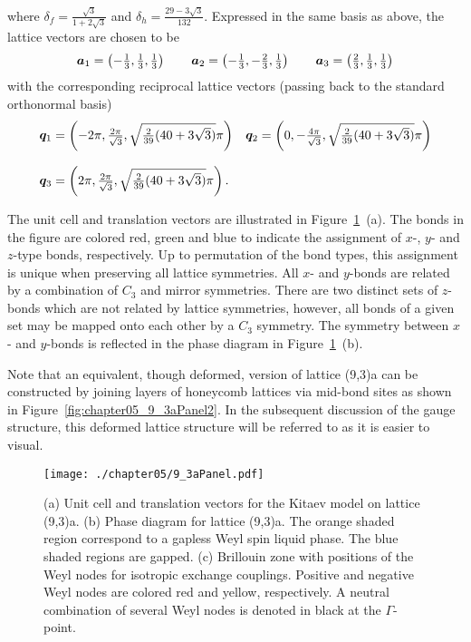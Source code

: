 %
where $\delta_f = \frac{\sqrt{3}}{1 + 2\sqrt{3}}$ and $\delta_h = \frac{29 - 3\sqrt{3}}{132}$.
Expressed in the same basis as above, the lattice vectors are chosen to be
%
\begin{equation}
	\begin{matrix*}[l]
		\ba_1 = \left(-\frac{1}{3}, \frac{1}{3}, \frac{1}{3}\right) \qquad
		\ba_2 = \left(-\frac{1}{3}, -\frac{2}{3}, \frac{1}{3}\right) \qquad
		\ba_3 = \left(\frac{2}{3}, \frac{1}{3}, \frac{1}{3}\right)
	\end{matrix*}
\end{equation}
%
with the corresponding reciprocal lattice vectors (passing back to the standard orthonormal basis)
%
\begin{equation}
	\begin{matrix*}[l]
		\bq_1 = \left(-2\pi, \frac{2\pi}{\sqrt{3}}, \sqrt{\frac{2}{39}(40 + 3\sqrt{3})}\pi\right) &
		\bq_2 = \left(0, -\frac{4\pi}{\sqrt{3}}, \sqrt{\frac{2}{39}(40 + 3\sqrt{3})}\pi\right) \\
		&\\
		\bq_3 = \left(2\pi, \frac{2\pi}{\sqrt{3}}, \sqrt{\frac{2}{39}(40 + 3\sqrt{3})}\pi\right). &
	\end{matrix*}
\end{equation}
%

The unit cell and translation vectors are illustrated in Figure~\ref{fig:chapter05_9_3aPanel}~(a).
The bonds in the figure are colored red, green and blue to indicate the assignment of $x$-, $y$- and $z$-type bonds, respectively.
Up to permutation of the bond types, this assignment is unique when preserving all lattice symmetries.
All $x$- and $y$-bonds are related by a combination of $C_3$ and mirror symmetries.
There are two distinct sets of $z$-bonds which are not related by lattice symmetries, however, all bonds of a given set may be mapped onto each other by a $C_3$ symmetry.
The symmetry between $x$- and $y$-bonds is reflected in the phase diagram in Figure~\ref{fig:chapter05_9_3aPanel}~(b).

Note that an equivalent, though deformed, version of lattice (9,3)a can be constructed by joining layers of honeycomb lattices via mid-bond sites as shown in Figure~\ref{fig:chapter05_9_3aPanel2}.
In the subsequent discussion of the gauge structure, this deformed lattice structure will be referred to as it is easier to visual.
%
\begin{figure}[tb]
	\centering
	\texttt{[image: ./chapter05/9\_3aPanel.pdf]}
	\caption{
		(a) Unit cell and translation vectors for the Kitaev model on lattice (9,3)a.
		(b) Phase diagram for lattice (9,3)a.
		The orange shaded region correspond to a gapless Weyl spin liquid phase.
		The blue shaded regions are gapped.
		(c) Brillouin zone with positions of the Weyl nodes for isotropic exchange couplings.
		Positive and negative Weyl nodes are colored red and yellow, respectively.
		A neutral combination of several Weyl nodes is denoted in black at the $\Gamma$-point.
	}
	\label{fig:chapter05_9_3aPanel}
\end{figure}
%


